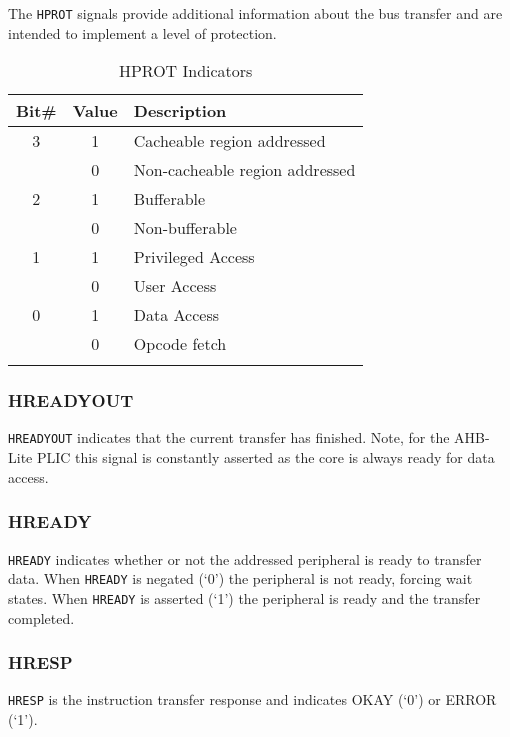 The \texttt{HPROT} signals provide additional information about the bus
transfer and are intended to implement a level of protection.

\begin{longtable}[]{@{}ccl@{}}
\toprule
\textbf{Bit\#} & \textbf{Value} & \textbf{Description}\tabularnewline
\midrule
\endhead
3 & 1 & Cacheable region addressed\tabularnewline
& 0 & Non-cacheable region addressed\tabularnewline
2 & 1 & Bufferable\tabularnewline
& 0 & Non-bufferable\tabularnewline
1 & 1 & Privileged Access\tabularnewline
& 0 & User Access\tabularnewline
0 & 1 & Data Access\tabularnewline
& 0 & Opcode fetch\tabularnewline
\bottomrule
\caption{HPROT Indicators}
\label{tab:HPROT}
\end{longtable}

\subsubsection{HREADYOUT}

\texttt{HREADYOUT} indicates that the current transfer has finished.
Note, for the AHB-Lite PLIC this signal is constantly asserted as the
core is always ready for data access.

\subsubsection{HREADY}

\texttt{HREADY} indicates whether or not the addressed peripheral is
ready to transfer data. When \texttt{HREADY} is negated (`0') the
peripheral is not ready, forcing wait states. When \texttt{HREADY} is
asserted (`1') the peripheral is ready and the transfer completed.

\subsubsection{HRESP}

\texttt{HRESP} is the instruction transfer response and indicates OKAY
(`0') or ERROR (`1').
